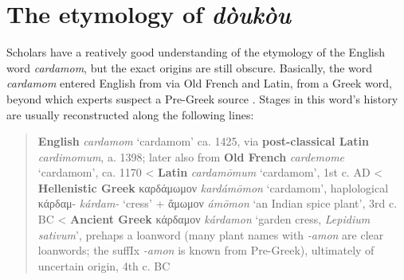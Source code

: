 \documentclass[12pt]{article}
\begin{document}




\section{The etymology of \textit{dòukòu}}\label{sec:etymology}

Scholars have a reatively good understanding of the etymology of the English word \textit{cardamom}, but the exact origins are still obscure. Basically, the word \textit{cardamom} entered English from via Old French and Latin, from a Greek word, beyond which experts suspect a Pre-Greek source \parencite{beekes_2010_etymological}. Stages in this word's history are usually reconstructed along the following lines:

\begin{quote}
    \textbf{English} \textit{cardamom} `cardamom' ca. 1425, via \textbf{post-classical Latin} \textit{cardimomum}, a. 1398; 
    later also from \textbf{Old French} \textit{cardemome} `cardamom', ca. 1170
    < \textbf{Latin} \textit{cardamōmum} `cardamom', 1st c. AD
    < \textbf{Hellenistic Greek} {καρδάμωμον} \textit{kardámōmon} `cardamom', haplological κάρδαμ- \textit{kárdam-} `cress' + ἄμωμον \textit{ámōmon} `an Indian spice plant', 3rd c. BC
    < \textbf{Ancient Greek} {κάρδαμον} \textit{kárdamon} `garden cress, \textit{Lepidium sativum}', prehaps a loanword (many plant names with \textit{-amon} are clear loanwords; the suffIx \textit{-amon} is known from Pre-Greek), ultimately of uncertain origin, 4th c. BC 
    \parencites[s.v. cardamom]{oed}[s.v. cardamome]{tlfi}[s.v. cardamomum]{lewis_1879_latin}[s.v. καρδάμωμον]{liddell_1940_greekenglish}[s.v. κάρδαμον]{liddell_1940_greekenglish}[644]{beekes_2010_etymological}
\end{quote}

\end{document}
